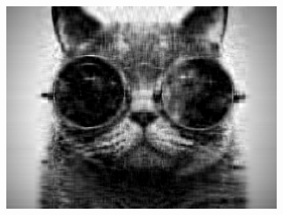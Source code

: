 \begin{figure}[h!]
\begin{subfigure}[c]{.3\textwidth}
\end{subfigure}
\begin{subfigure}[c]{.3\textwidth}
\includegraphics[width=.9\linewidth]{images/cat20}
\end{subfigure}


\end{figure}
